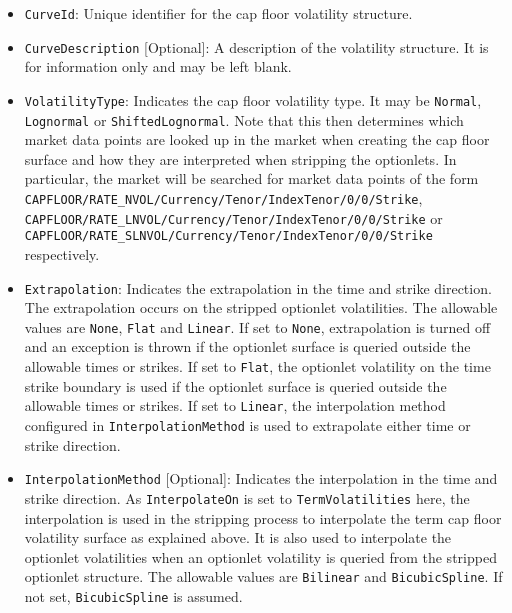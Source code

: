 \begin{itemize}
\item
\lstinline!CurveId!: Unique identifier for the cap floor volatility structure.

\item \lstinline!CurveDescription! [Optional]:
A description of the volatility structure. It is for information only and may be left blank.

\item \lstinline!VolatilityType!:
Indicates the cap floor volatility type. It may be \lstinline!Normal!, \lstinline!Lognormal! or \lstinline!ShiftedLognormal!. Note that this then determines which market data points are looked up in the market when creating the cap floor surface and how they are interpreted when stripping the optionlets. In particular, the market will be searched for market data points of the form \lstinline!CAPFLOOR/RATE_NVOL/Currency/Tenor/IndexTenor/0/0/Strike!, \lstinline!CAPFLOOR/RATE_LNVOL/Currency/Tenor/IndexTenor/0/0/Strike! or \lstinline!CAPFLOOR/RATE_SLNVOL/Currency/Tenor/IndexTenor/0/0/Strike! respectively.

\item \lstinline!Extrapolation!:
Indicates the extrapolation in the time and strike direction. The extrapolation occurs on the stripped optionlet volatilities. The allowable values are \lstinline!None!, \lstinline!Flat! and \lstinline!Linear!. If set to \lstinline!None!, extrapolation is turned off and an exception is thrown if the optionlet surface is queried outside the allowable times or strikes. If set to \lstinline!Flat!, the optionlet volatility on the time strike boundary is used if the optionlet surface is queried outside the allowable times or strikes. If set to \lstinline!Linear!, the interpolation method configured in \lstinline!InterpolationMethod! is used to extrapolate either time or strike direction.

\item \lstinline!InterpolationMethod! [Optional]:
Indicates the interpolation in the time and strike direction. As \lstinline!InterpolateOn! is set to \lstinline!TermVolatilities! here, the interpolation is used in the stripping process to interpolate the term cap floor volatility surface as explained above. It is also used to interpolate the optionlet volatilities when an optionlet volatility is queried from the stripped optionlet structure. The allowable values are \lstinline!Bilinear! and \lstinline!BicubicSpline!. If not set, \lstinline!BicubicSpline! is assumed.


\end{itemize}
